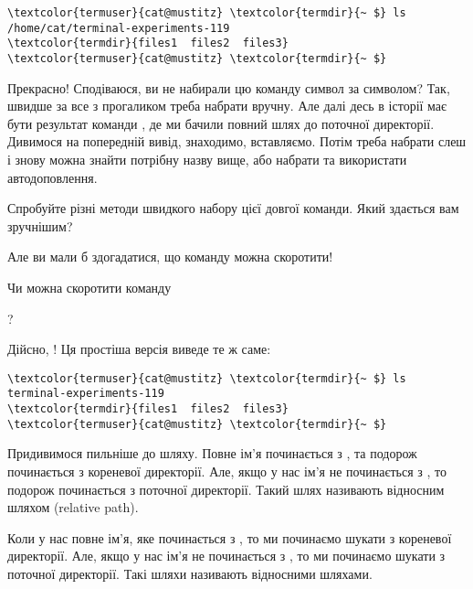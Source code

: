\begin{Verbatim}[fontsize=\footnotesize,commandchars=\\\{\},xleftmargin=\parindent]
\textcolor{termuser}{cat@mustitz} \textcolor{termdir}{~ $} ls /home/cat/terminal-experiments-119
\textcolor{termdir}{files1  files2  files3}
\textcolor{termuser}{cat@mustitz} \textcolor{termdir}{~ $}
\end{Verbatim}

Прекрасно!
Сподіваюся, ви не набирали цю команду символ за символом?
Так, швидше за все  з прогаликом треба набрати вручну.
Але далі десь в історії має бути результат команди ,
де ми бачили повний шлях до поточної директорії.
Дивимося на попередній вивід, знаходимо, вставляємо.
Потім треба набрати слеш і знову можна знайти потрібну назву вище,
або набрати  та використати автодоповлення.

\begin{exercise}
Спробуйте різні методи швидкого набору цієї довгої команди.
Який здається вам зручнішим?
\end{exercise}

Але ви мали б здогадатися, що команду можна скоротити!

\begin{exercise}
Чи можна скоротити команду\par{}?
\end{exercise}

Дійсно, !
Ця простіша версія виведе те ж саме:

\begin{Verbatim}[fontsize=\footnotesize,commandchars=\\\{\},xleftmargin=\parindent]
\textcolor{termuser}{cat@mustitz} \textcolor{termdir}{~ $} ls terminal-experiments-119
\textcolor{termdir}{files1  files2  files3}
\textcolor{termuser}{cat@mustitz} \textcolor{termdir}{~ $}
\end{Verbatim}

Придивимося пильніше до шляху.
Повне ім'я починається з \chr{/}, та подорож починається з кореневої директорії.
Але, якщо у нас ім'я не починається з \chr{/}, то подорож починається з поточної директорії.
Такий шлях називають відносним шляхом (relative path).

Коли у нас повне ім'я, яке починається з \chr{/},
то ми починаємо шукати з кореневої директорії.
Але, якщо у нас ім'я не починається з \chr{/},
то ми починаємо шукати з поточної директорії.
Такі шляхи називають відносними шляхами.

